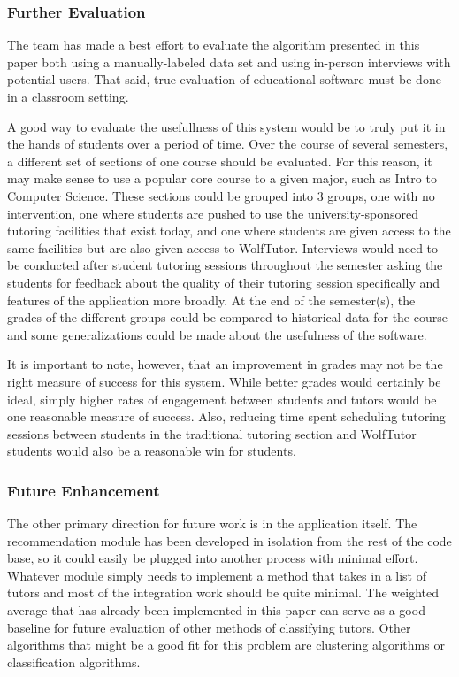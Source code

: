 \subsubsection{Further Evaluation}
\label{sec:further-evaluation}
The team has made a best effort to evaluate the algorithm presented in this
paper both using a manually-labeled data set and using in-person interviews with
potential users. That said, true evaluation of educational software must be done
in a classroom setting.  

A good way to evaluate the usefullness of this system would be to truly put it
in the hands of students over a period of time. Over the course of several
semesters, a different set of sections of one course should be evaluated.  For
this reason, it may make sense to use a popular core course to a given major,
such as Intro to Computer Science.  These sections could be grouped into 3
groups, one with no intervention, one where students are pushed to use the
university-sponsored tutoring facilities that exist today, and one where
students are given access to the same facilities but are also given access to
WolfTutor.  Interviews would need to be conducted after student tutoring
sessions throughout the semester asking the students for feedback about the
quality of their tutoring session specifically and features of the application
more broadly.  At the end of the semester(s), the grades of the different groups
could be compared to historical data for the course and some generalizations
could be made about the usefulness of the software.

It is important to note, however, that an improvement in grades may not be the
right measure of success for this system. While better grades would certainly be
ideal, simply higher rates of engagement between students and tutors would be
one reasonable measure of success. Also, reducing time spent scheduling tutoring
sessions between students in the traditional tutoring section and WolfTutor
students would also be a reasonable win for students.  

\subsubsection{Future Enhancement}
\label{sec:future-enhancement}
The other primary direction for future work is in the application itself.  The
recommendation module has been developed in isolation from the rest of the code
base, so it could easily be plugged into another process with minimal effort.
Whatever module simply needs to implement a method that takes in a list of
tutors and most of the integration work should be quite minimal.  The weighted
average that has already been implemented in this paper can serve as a good
baseline for future evaluation of other methods of classifying tutors.  Other
algorithms that might be a good fit for this problem are clustering algorithms
or classification algorithms.

